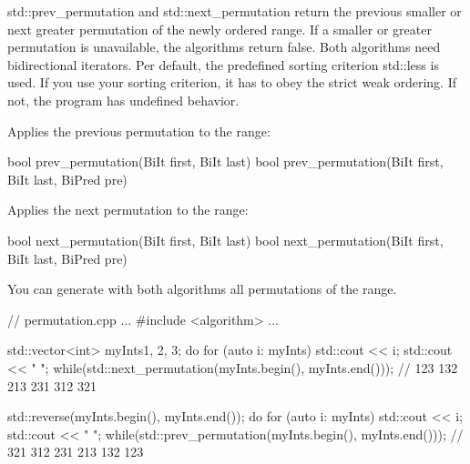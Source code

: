 
std::prev\_permutation and std::next\_permutation return the previous smaller or next greater permutation of the newly ordered range. If a smaller or greater permutation is unavailable, the algorithms return false. Both algorithms need bidirectional iterators. Per default, the predefined sorting criterion std::less is used. If you use your sorting criterion, it has to obey the strict weak ordering. If not, the program has undefined behavior.

Applies the previous permutation to the range:

\begin{cpp}
bool prev_permutation(BiIt first, BiIt last)
bool prev_permutation(BiIt first, BiIt last, BiPred pre)
\end{cpp}

Applies the next permutation to the range:

\begin{cpp}
bool next_permutation(BiIt first, BiIt last)
bool next_permutation(BiIt first, BiIt last, BiPred pre)
\end{cpp}

You can generate with both algorithms all permutations of the range.


\begin{cpp}
// permutation.cpp
...
#include <algorithm>
...

std::vector<int> myInts{1, 2, 3};
do{
	for (auto i: myInts) std::cout << i;
	std::cout << " ";
} while(std::next_permutation(myInts.begin(), myInts.end()));
										// 123 132 213 231 312 321

std::reverse(myInts.begin(), myInts.end());
do{
	for (auto i: myInts) std::cout << i;
	std::cout << " ";
} while(std::prev_permutation(myInts.begin(), myInts.end()));
										// 321 312 231 213 132 123
\end{cpp}




















